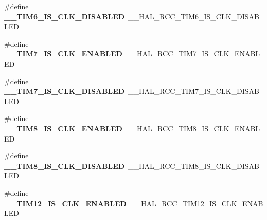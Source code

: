 \begin{DoxyCompactItemize}
\item 
\hypertarget{group___h_a_l___r_c_c___aliased_ga7388045de140441a9623a6a3b10fd60f}{\#define {\bfseries \-\_\-\-\_\-\-T\-I\-M6\-\_\-\-I\-S\-\_\-\-C\-L\-K\-\_\-\-D\-I\-S\-A\-B\-L\-E\-D}~\-\_\-\-\_\-\-H\-A\-L\-\_\-\-R\-C\-C\-\_\-\-T\-I\-M6\-\_\-\-I\-S\-\_\-\-C\-L\-K\-\_\-\-D\-I\-S\-A\-B\-L\-E\-D}\label{group___h_a_l___r_c_c___aliased_ga7388045de140441a9623a6a3b10fd60f}

\item 
\hypertarget{group___h_a_l___r_c_c___aliased_gaa484c04105e0d337939113a91662be6d}{\#define {\bfseries \-\_\-\-\_\-\-T\-I\-M7\-\_\-\-I\-S\-\_\-\-C\-L\-K\-\_\-\-E\-N\-A\-B\-L\-E\-D}~\-\_\-\-\_\-\-H\-A\-L\-\_\-\-R\-C\-C\-\_\-\-T\-I\-M7\-\_\-\-I\-S\-\_\-\-C\-L\-K\-\_\-\-E\-N\-A\-B\-L\-E\-D}\label{group___h_a_l___r_c_c___aliased_gaa484c04105e0d337939113a91662be6d}

\item 
\hypertarget{group___h_a_l___r_c_c___aliased_ga5060996ff360bbc9ff44e7089d970e14}{\#define {\bfseries \-\_\-\-\_\-\-T\-I\-M7\-\_\-\-I\-S\-\_\-\-C\-L\-K\-\_\-\-D\-I\-S\-A\-B\-L\-E\-D}~\-\_\-\-\_\-\-H\-A\-L\-\_\-\-R\-C\-C\-\_\-\-T\-I\-M7\-\_\-\-I\-S\-\_\-\-C\-L\-K\-\_\-\-D\-I\-S\-A\-B\-L\-E\-D}\label{group___h_a_l___r_c_c___aliased_ga5060996ff360bbc9ff44e7089d970e14}

\item 
\hypertarget{group___h_a_l___r_c_c___aliased_gaf47e9207e83e8bfdd1ccedca25adb919}{\#define {\bfseries \-\_\-\-\_\-\-T\-I\-M8\-\_\-\-I\-S\-\_\-\-C\-L\-K\-\_\-\-E\-N\-A\-B\-L\-E\-D}~\-\_\-\-\_\-\-H\-A\-L\-\_\-\-R\-C\-C\-\_\-\-T\-I\-M8\-\_\-\-I\-S\-\_\-\-C\-L\-K\-\_\-\-E\-N\-A\-B\-L\-E\-D}\label{group___h_a_l___r_c_c___aliased_gaf47e9207e83e8bfdd1ccedca25adb919}

\item 
\hypertarget{group___h_a_l___r_c_c___aliased_gac644d31214f71a4b97900297ce75fbc3}{\#define {\bfseries \-\_\-\-\_\-\-T\-I\-M8\-\_\-\-I\-S\-\_\-\-C\-L\-K\-\_\-\-D\-I\-S\-A\-B\-L\-E\-D}~\-\_\-\-\_\-\-H\-A\-L\-\_\-\-R\-C\-C\-\_\-\-T\-I\-M8\-\_\-\-I\-S\-\_\-\-C\-L\-K\-\_\-\-D\-I\-S\-A\-B\-L\-E\-D}\label{group___h_a_l___r_c_c___aliased_gac644d31214f71a4b97900297ce75fbc3}

\item 
\hypertarget{group___h_a_l___r_c_c___aliased_ga0c5637eebc7a41d8e9d9d7ff1fb9deec}{\#define {\bfseries \-\_\-\-\_\-\-T\-I\-M12\-\_\-\-I\-S\-\_\-\-C\-L\-K\-\_\-\-E\-N\-A\-B\-L\-E\-D}~\-\_\-\-\_\-\-H\-A\-L\-\_\-\-R\-C\-C\-\_\-\-T\-I\-M12\-\_\-\-I\-S\-\_\-\-C\-L\-K\-\_\-\-E\-N\-A\-B\-L\-E\-D}\label{group___h_a_l___r_c_c___aliased_ga0c5637eebc7a41d8e9d9d7ff1fb9deec}


\end{DoxyCompactItemize}
